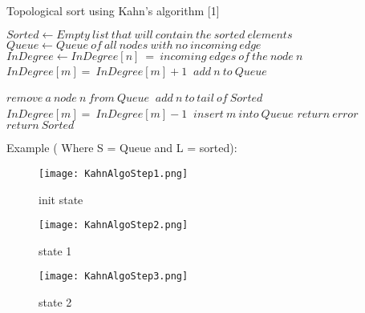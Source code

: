 \documentclass[12pt]{article}
\begin{document}
\begin{algorithm}

  \caption{Topological sort using Kahn's algorithm  [1]}
  
  \begin{algorithmic}[1]
    \Statex
        \State $Sorted \gets Empty\ list\ that\ will\ contain\ the\ sorted\ elements $
        \State $Queue \gets Queue\ of\ all\ nodes\ with\ no\ incoming\ edge\ $
        \State $InDegree \gets InDegree[n]\ =\  incoming\ edges\ of\ the\ node\ n$
        \Statex
                \State $InDegree[m]=\ InDegree[m]+1\ $  
            \EndFor
        \EndFor
        \Statex
                \State $ add\ n\ to\ Queue  $
                \EndIf
        \EndFor
        \Statex
        
            \State $remove\ a\ node\ n\ from\ Queue \ $
            \State $add\ n\ to\ tail\ of\ Sorted\ $
                 \State $InDegree[m]=\ InDegree[m]-1\ $
                 
                    \State $insert\ m\ into\ Queue $
                \EndIf
            \EndFor
        \EndWhile
        \Statex
            \State $return\ error\ $ 
        \Else
        \State $return\ Sorted\ $ 
        \EndIf
     \EndProcedure
  \end{algorithmic}
 
\end{algorithm}

Example ( Where S = Queue and L = sorted):
\begin{figure}[H]
\centering
\texttt{[image: KahnAlgoStep1.png]}
\caption{init state}
\end{figure}

\begin{figure}[H]
\centering
\texttt{[image: KahnAlgoStep2.png]}
\caption{state 1}
\end{figure}

\begin{figure}[H]
\centering
\texttt{[image: KahnAlgoStep3.png]}
\caption{state 2}
\end{figure}
\end{document}
